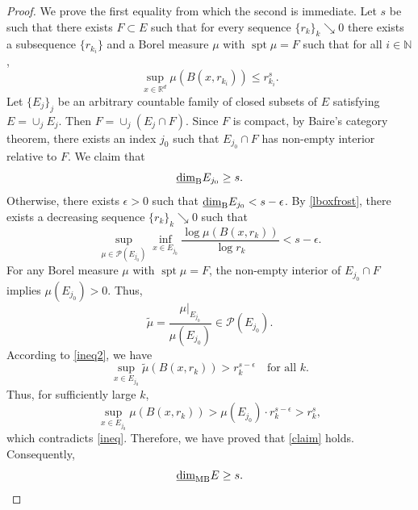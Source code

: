 \documentclass[12pt]{article}
\newcommand{\1}{{\bf 1}}
\DeclareMathOperator{\spt}{spt}
\newcommand\lbd{\underline{\mbox{\rm dim}}_{\rm B}} %
\newcommand\mlbd{\underline{\mbox{\rm dim}}_{\rm MB}} %
\newcommand{\R}{\mathbb{R}}
\begin{document}
\begin{proof}
		We prove the first equality from which the second is immediate.
	Let $s$ be such that there exists $F\subset E$ such that for every sequence $\{r_k\}_k\searrow 0$ there exists a subsequence $\{r_{k_i}\}$ and  a Borel measure $\mu$ with $\spt\mu=F$  such that for  all   $i\in\mathbb{N}$,
	\begin{equation}\label{ineq}
	\sup_{x\in\R^d}	\mu(B(x,r_{k_i}))\leq  r_{k_i}^s.
	\end{equation}
	Let $\{E_j\}_j$ be an arbitrary countable  family  of closed subsets of  $E$ satisfying $E=\cup_j E_j$. 
	Then $F=\cup_j( E_j\cap F) $. 
	Since $ F$ is compact, by Baire's category theorem, there  exists an  index  $j_0$ such that $E_{j_0}\cap F$ has non-empty interior relative to $F$. 
	We claim that 
	\begin{equation}\label{claim}
		\lbd E_{j_0}\geq s.
	\end{equation}
	 Otherwise, there exists $\epsilon>0$ such that $\lbd E_{j_0}<s-\epsilon$.  By \eqref{lboxfrost}, there exists a decreasing sequence $\{r_k\}_k\searrow 0$ such that 
	\begin{equation}\label{ineq2}
		\sup_{\mu \in \mathcal{P}(E_{j_0})}\inf_{x\in E_{j_0}}\frac{\log  \mu(B(x,r_k))}{ \log r_k}<s-\epsilon.
	\end{equation}
	 For any Borel measure $\mu $ with $\spt\mu=F$,  the non-empty interior of $E_{j_0}\cap F$ implies  $\mu(E_{j_0})>0$.  Thus, $$\widetilde{\mu}=\dfrac{\mu|_{E_{j_0}}}{\mu(E_{j_0})} \in \mathcal{P}(E_{j_0}).$$
	According to \eqref{ineq2},  we have  $$\sup_{x\in E_{j_0}}\widetilde{\mu}(B(x,r_k))>r_k^{s-\epsilon}\quad\text{for all }k.$$
	Thus,  for sufficiently large $k$,
	\begin{equation*}
		\sup_{x\in E_{j_0}} {\mu}(B(x,r_k))>\mu(E_{j_0})\cdot r_k^{s-\epsilon}>r_k^s,
	\end{equation*}
	 which contradicts  \eqref{ineq}.  Therefore, we have proved that \eqref{claim} holds.  Consequently, $$\mlbd E \geq s.$$


\end{proof}
\end{document}
